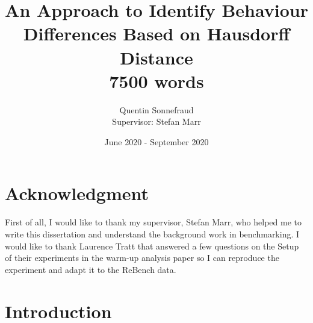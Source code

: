 \documentclass[12pt,a4paper]{article}
\title{An Approach to Identify Behaviour Differences Based on Hausdorff Distance \\ 7500 words}
\author{Quentin Sonnefraud \\ Supervisor: Stefan Marr}
\date{June 2020 - September 2020}
\begin{document}
\maketitle

\tableofcontents

\newpage

\section{Acknowledgment}


First of all, I would like to thank my supervisor, Stefan Marr, who helped me to write this dissertation and understand the background work in benchmarking. \newline
I would like to thank Laurence Tratt that answered a few questions on the Setup of their experiments in the warm-up analysis paper so I can reproduce the experiment and adapt it to the ReBench data.


\section{Introduction}
\end{document}
